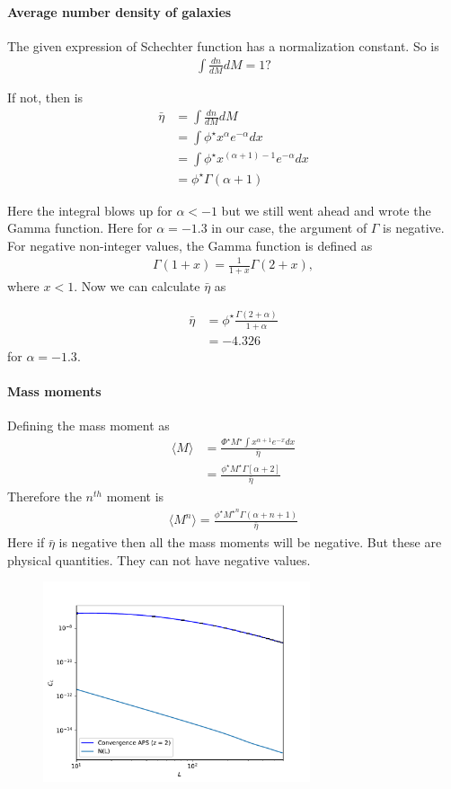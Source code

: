 \documentclass[12pt]{article}
\numberwithin{equation}{section}
\begin{document}
\paragraph{Average number density of galaxies} The given expression of Schechter function has a normalization constant. So is
\begin{align}
\int \frac{dn}{dM}dM = 1?
\end{align}

If not, then is
\begin{align}
\bar{\eta} &= \int \frac{dn}{dM}dM\\
&= \int \phi^\star x^\alpha e^{-\alpha} dx \\
&= \int \phi^\star x^{(\alpha + 1) - 1} e^{-\alpha} dx \\
&= \phi^\star\Gamma(\alpha + 1)
\end{align}

Here the integral blows up for $ \alpha < -1 $ but we still went ahead and wrote the Gamma function. 
Here for $ \alpha = -1.3 $ in our case, the argument of $\Gamma$ is negative. For negative non-integer values, the Gamma function is defined as
\begin{align}
\Gamma(1+x) = \frac{1}{1+x}\Gamma(2 + x),
\end{align}
where $ x < 1$. Now we can calculate $\bar{\eta}$ as

\begin{align}
\bar{\eta}  &= \phi^\star \frac{\Gamma(2 + \alpha)}{1 + \alpha}\\
&= -4.326
\end{align} 
for $ \alpha  = -1.3$.

\paragraph{Mass moments}
Defining the mass moment as
\begin{align}
\langle M \rangle &= \frac{\Phi^\star M^\star \int  x^{\alpha + 1} e^{-x}dx}{\bar{\eta}}\\
&= \frac{\phi^\star M^\star \Gamma[\alpha + 2]}{\bar{\eta}}
\end{align}
Therefore the $ n^{th} $ moment is
\begin{align}
\langle M^n \rangle = \frac{\phi^\star {M^\star}^n \Gamma(\alpha + n + 1)}{\bar{\eta}}
\end{align}
Here if $\bar{\eta}$ is negative then all the mass moments will be negative. But these are physical quantities. They can not have negative values.


\begin{figure}
	\centering
	\includegraphics[width=0.7\textwidth]{full_plot_j_max_1_lmax_1000}
\end{figure}
\end{document}
